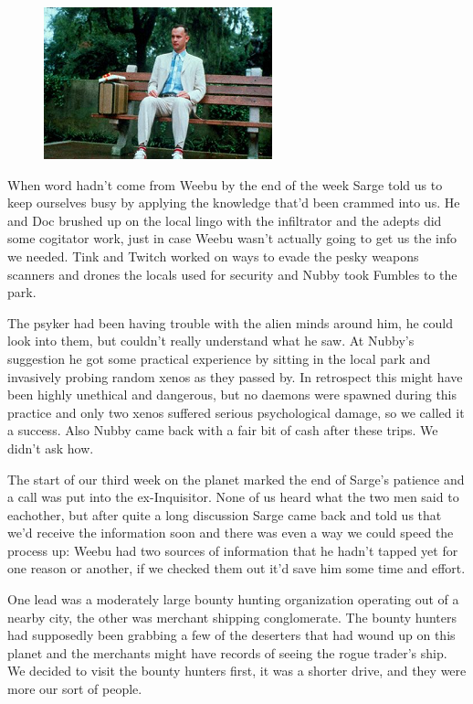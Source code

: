 \begin{figure}
	\begin{center}
		\includegraphics[width=\figwidth]{pics/10/20.png}
	\end{center}
\end{figure}
When word hadn't come from Weebu by the end of the week Sarge told us to keep ourselves busy by applying the knowledge that'd been crammed into us. 
He and Doc brushed up on the local lingo with the infiltrator and the adepts did some cogitator work, just in case Weebu wasn't actually going to get us the info we needed. 
Tink and Twitch worked on ways to evade the pesky weapons scanners and drones the locals used for security and Nubby took Fumbles to the park. 


The psyker had been having trouble with the alien minds around him, he could look into them, but couldn't really understand what he saw. 
At Nubby's suggestion he got some practical experience by sitting in the local park and invasively probing random xenos as they passed by. 
In retrospect this might have been highly unethical and dangerous, but no daemons were spawned during this practice and only two xenos suffered serious psychological damage, so we called it a success. 
Also Nubby came back with a fair bit of cash after these trips. 
We didn't ask how.

The start of our third week on the planet marked the end of Sarge's patience and a call was put into the ex-Inquisitor. 
None of us heard what the two men said to eachother, but after quite a long discussion Sarge came back and told us that we'd receive the information soon and there was even a way we could speed the process up: 
Weebu had two sources of information that he hadn't tapped yet for one reason or another, if we checked them out it'd save him some time and effort.

One lead was a moderately large bounty hunting organization operating out of a nearby city, the other was merchant shipping conglomerate. 
The bounty hunters had supposedly been grabbing a few of the deserters that had wound up on this planet and the merchants might have records of seeing the rogue trader's ship. 
We decided to visit the bounty hunters first, it was a shorter drive, and they were more our sort of people.

